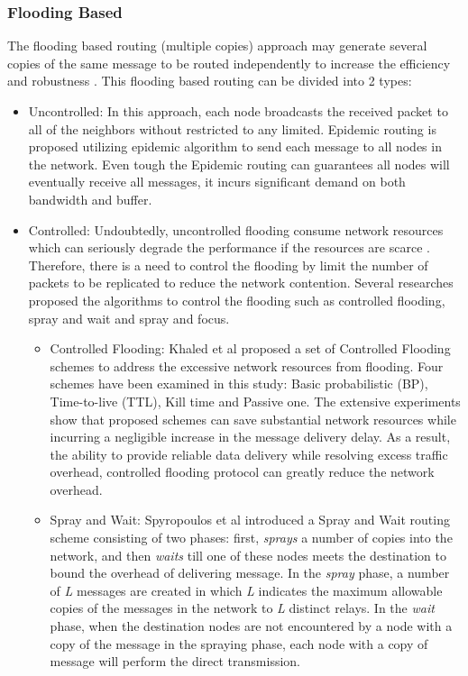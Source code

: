 \subsubsection{Flooding Based }
\label{bg:Opportunistic Networks:Classification of Opportunistic Routing:FB}
The flooding based routing (multiple copies) approach may generate several copies of the same message to be routed independently to increase the efficiency and robustness \cite{Chung-Ming2008}.  
This flooding based routing can be divided into 2 types:
\begin{itemize}
	\item Uncontrolled:
	In this approach, each node broadcasts the received packet to all of the neighbors without restricted to any limited. 
	Epidemic routing \cite{Vahdat2000} is proposed utilizing epidemic algorithm to send each message to all nodes in the network.
	Even tough the Epidemic routing can guarantees all nodes will eventually receive all messages, it incurs significant demand on both bandwidth and buffer.
	\item Controlled:
	Undoubtedly, uncontrolled flooding consume network resources which can seriously degrade the performance if the resources are scarce \cite{Tonguz2006}.
	Therefore, there is a need to control the flooding by limit the number of packets to be replicated to reduce the network contention.
	Several researches proposed the algorithms to control the flooding such as controlled flooding, spray and wait and spray and focus.
	\begin{itemize}
		
		\item Controlled Flooding: 
		Khaled et al \cite{Khaled2009} proposed a set of Controlled Flooding schemes to address the excessive network resources from flooding. 
		Four schemes have been examined in this study: Basic probabilistic (BP), Time-to-live (TTL), Kill time and Passive one.
		The extensive experiments show that proposed schemes can save substantial network resources while incurring a negligible increase in the message delivery delay.
		As a result, the ability to provide reliable data delivery while resolving excess traffic overhead, controlled flooding protocol can greatly reduce the network overhead.
		
		\item Spray and Wait:
		Spyropoulos et al \cite{Spyropoulos2005} introduced a Spray and Wait routing scheme consisting of two phases: first, \emph{sprays} a number of copies into the network, and then \emph{waits} till one of these nodes meets the destination to bound the overhead of delivering message.
		In the \emph{spray} phase, a number of \emph{L} messages are created in which \emph{L} indicates the maximum allowable copies of the messages in the network to \emph{L} distinct relays.
		In the \emph{wait} phase, when the destination nodes are not encountered by a node with a copy of the message in the spraying phase, each node with a copy of message will perform the direct transmission.
		

\end{itemize}
\end{itemize}
